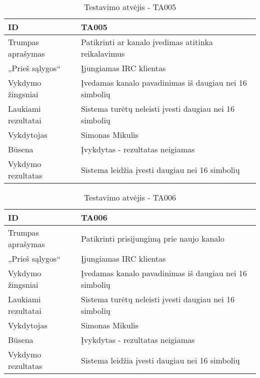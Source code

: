 \begin{table}[]
  \centering
  \label{table:TA005}
  \begin{tabular}{|l|l|}
    \hline
    ID                  & TA005                                                                  \\ \hline
    Trumpas aprašymas   & Patikrinti ar kanalo įvedimas atitinka reikalavimus                    \\ \hline
    „Prieš sąlygos“     & Įjungiamas IRC klientas                                                \\ \hline
    Vykdymo žingsniai   & Įvedamas kanalo pavadinimas iš daugiau nei 16 simbolių                 \\ \hline
    Laukiami rezultatai & Sistema turėtų neleisti įvesti daugiau nei 16 simbolių                 \\ \hline
    Vykdytojas          & Simonas Mikulis                                                        \\ \hline
    Būsena              & Įvykdytas - rezultatas neigiamas                                       \\ \hline
    Vykdymo rezultatas  & \cellcolor[HTML]{FF0000}Sistema leidžia įvesti daugiau nei 16 simbolių \\ \hline
  \end{tabular}
  \caption{Testavimo atvėjis - TA005}
\end{table}

\begin{table}[]
  \centering
  \label{table:TA006}
  \begin{tabular}{|l|l|}
    \hline
    ID                  & TA006                                                                  \\ \hline
    Trumpas aprašymas   & Patikrinti prisijungimą prie naujo kanalo                              \\ \hline
    „Prieš sąlygos“     & Įjungiamas IRC klientas                                                \\ \hline
    Vykdymo žingsniai   & Įvedamas kanalo pavadinimas iš daugiau nei 16 simbolių                 \\ \hline
    Laukiami rezultatai & Sistema turėtų neleisti įvesti daugiau nei 16 simbolių                 \\ \hline
    Vykdytojas          & Simonas Mikulis                                                        \\ \hline
    Būsena              & Įvykdytas - rezultatas neigiamas                                       \\ \hline
    Vykdymo rezultatas  & \cellcolor[HTML]{FF0000}Sistema leidžia įvesti daugiau nei 16 simbolių \\ \hline
  \end{tabular}
  \caption{Testavimo atvėjis - TA006}
\end{table}

